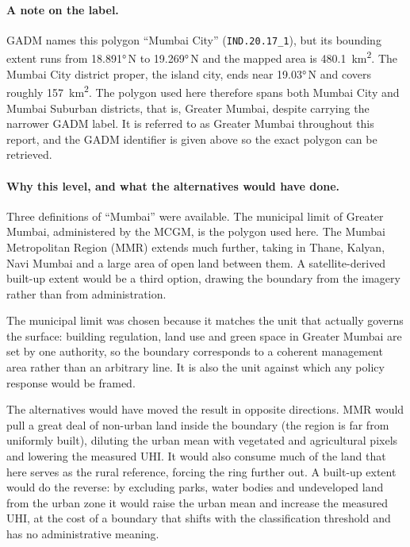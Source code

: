 \documentclass[11pt,a4paper]{article}
\begin{document}
\paragraph{A note on the label.}
GADM names this polygon ``Mumbai City'' (\texttt{IND.20.17\_1}), but
its bounding extent runs from \ang{18.891}\,N to \ang{19.269}\,N and
the mapped area is \SI{480.1}{\kilo\metre\squared}. The Mumbai City
district proper, the island city, ends near \ang{19.03}\,N and covers
roughly \SI{157}{\kilo\metre\squared}. The polygon used here therefore
spans both Mumbai City and Mumbai Suburban districts, that is, Greater
Mumbai, despite carrying the narrower GADM label. It is referred to as
Greater Mumbai throughout this report, and the GADM identifier is
given above so the exact polygon can be retrieved.

\paragraph{Why this level, and what the alternatives would have done.}
Three definitions of ``Mumbai'' were available. The municipal limit of
Greater Mumbai, administered by the MCGM, is the polygon used here.
The Mumbai Metropolitan Region (MMR) extends much further, taking in
Thane, Kalyan, Navi Mumbai and a large area of open land between them.
A satellite-derived built-up extent would be a third option, drawing
the boundary from the imagery rather than from administration.

The municipal limit was chosen because it matches the unit that
actually governs the surface: building regulation, land use and green
space in Greater Mumbai are set by one authority, so the boundary
corresponds to a coherent management area rather than an arbitrary
line. It is also the unit against which any policy response would be
framed.

The alternatives would have moved the result in opposite directions.
MMR would pull a great deal of non-urban land inside the boundary
(the region is far from uniformly built), diluting the urban mean
with vegetated and agricultural pixels and lowering the measured UHI.
It would also consume much of the land that here serves as the rural
reference, forcing the ring further out. A built-up extent would do
the reverse: by excluding parks, water bodies and undeveloped land
from the urban zone it would raise the urban mean and increase the
measured UHI, at the cost of a boundary that shifts with the
classification threshold and has no administrative meaning.
\end{document}

